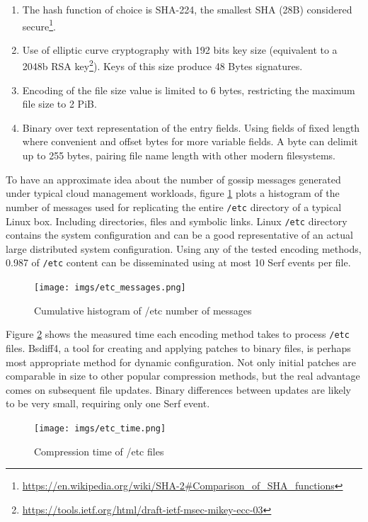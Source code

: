 \documentclass{sig-alternate}
\begin{document}
\begin{enumerate}
\item The hash function of choice is SHA-224, the smallest SHA (28B) considered secure\footnote{\url{https://en.wikipedia.org/wiki/SHA-2\#Comparison\_of\_SHA\_functions}}.
\item Use of elliptic curve cryptography with 192 bits key size (equivalent to a 2048b RSA key\footnote{\url{https://tools.ietf.org/html/draft-ietf-msec-mikey-ecc-03}}). Keys of this size produce 48 Bytes signatures.
\item Encoding of the file size value is limited to 6 bytes, restricting the maximum file size to 2 PiB.
\item Binary over text representation of the entry fields. Using fields of fixed length where convenient and offset bytes for more variable fields. A byte can delimit up to 255 bytes, pairing file name length with other modern filesystems.
\end{enumerate}

To have an approximate idea about the number of gossip messages generated under typical cloud management workloads, figure \ref{fig:etc-messages} plots a histogram of the number of messages used for replicating the entire \texttt{/etc} directory of a typical Linux box. Including directories, files and symbolic links. Linux \texttt{/etc} directory contains the system configuration and can be a good representative of an actual large distributed system configuration. Using any of the tested encoding methods, 0.987 of \texttt{/etc} content can be disseminated using at most 10 Serf events per file.

\begin{figure}
\centering
\texttt{[image: imgs/etc\_messages.png]}
\caption{Cumulative histogram of /etc number of messages}
\label{fig:etc-messages}
\end{figure}

Figure \ref{fig:etc-time} shows the measured time each encoding method takes to process \texttt{/etc} files. Bsdiff4, a tool for creating and applying patches to binary files, is perhaps most appropriate method for dynamic configuration. Not only initial patches are comparable in size to other popular compression methods, but the real advantage comes on subsequent file updates. Binary differences between updates are likely to be very small, requiring only one Serf event.

\begin{figure}
\centering
\texttt{[image: imgs/etc\_time.png]}
\caption{Compression time of /etc files}
\label{fig:etc-time}
\end{figure}
\end{document}

